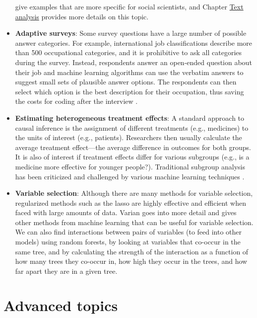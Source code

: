 \documentclass[]{krantz}
\begin{document}
\begin{itemize}
  \citeyearpar{grimmer2013text} give examples that are more specific for
  social scientists, and Chapter \protect\hyperlink{chap:text}{Text
  analysis} provides more details on this topic.
\item
  \textbf{Adaptive surveys}: Some survey questions have a large number
  of possible answer categories. For example, international job
  classifications describe more than 500 occupational categories, and it
  is prohibitive to ask all categories during the survey. Instead,
  respondents answer an open-ended question about their job and machine
  learning algorithms can use the verbatim answers to suggest small sets
  of plausible answer options. The respondents can then select which
  option is the best description for their occupation, thus saving the
  costs for coding after the interview \citep{Schierholz2018}.
\item
  \textbf{Estimating heterogeneous treatment effects}: A standard
  approach to causal inference is the assignment of different treatments
  (e.g., medicines) to the units of interest (e.g., patients).
  Researchers then usually calculate the average treatment effect---the
  average difference in outcomes for both groups. It is also of interest
  if treatment effects differ for various subgroups (e.g., is a medicine
  more effective for younger people?). Traditional subgroup analysis has
  been criticized and challenged by various machine learning techniques
  \citep{green2012modeling, imai2013estimating}.
\item
  \textbf{Variable selection}: Although there are many methods for
  variable selection, regularized methods such as the lasso are highly
  effective and efficient when faced with large amounts of data. Varian
  \citeyearpar{varian2014big} goes into more detail and gives other
  methods from machine learning that can be useful for variable
  selection. We can also find interactions between pairs of variables
  (to feed into other models) using random forests, by looking at
  variables that co-occur in the same tree, and by calculating the
  strength of the interaction as a function of how many trees they
  co-occur in, how high they occur in the trees, and how far apart they
  are in a given tree.
\end{itemize}

\section{Advanced topics}\label{advanced-topics}
\end{document}
